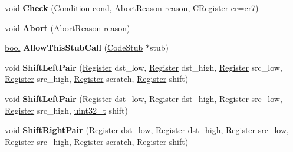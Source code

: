 \begin{DoxyCompactItemize}
void {\bfseries Check} (Condition cond, Abort\+Reason reason, \mbox{\hyperlink{classv8_1_1internal_1_1CRegister}{C\+Register}} cr=cr7)
\item 
\mbox{\label{classv8_1_1internal_1_1TurboAssembler_a714d3b6a967aed8110ff6170772850ec}} 
void {\bfseries Abort} (Abort\+Reason reason)
\item 
\mbox{\label{classv8_1_1internal_1_1TurboAssembler_a20348b464d89447388016d14eb6cb7e3}} 
\mbox{\hyperlink{classbool}{bool}} {\bfseries Allow\+This\+Stub\+Call} (\mbox{\hyperlink{classv8_1_1internal_1_1CodeStub}{Code\+Stub}} $\ast$stub)
\item 
\mbox{\label{classv8_1_1internal_1_1TurboAssembler_a0364a4d6542750fcecbc2dfd75e93b7a}} 
void {\bfseries Shift\+Left\+Pair} (\mbox{\hyperlink{classv8_1_1internal_1_1Register}{Register}} dst\+\_\+low, \mbox{\hyperlink{classv8_1_1internal_1_1Register}{Register}} dst\+\_\+high, \mbox{\hyperlink{classv8_1_1internal_1_1Register}{Register}} src\+\_\+low, \mbox{\hyperlink{classv8_1_1internal_1_1Register}{Register}} src\+\_\+high, \mbox{\hyperlink{classv8_1_1internal_1_1Register}{Register}} scratch, \mbox{\hyperlink{classv8_1_1internal_1_1Register}{Register}} shift)
\item 
\mbox{\label{classv8_1_1internal_1_1TurboAssembler_acb36c65b1134f076db27f56dc48e1a84}} 
void {\bfseries Shift\+Left\+Pair} (\mbox{\hyperlink{classv8_1_1internal_1_1Register}{Register}} dst\+\_\+low, \mbox{\hyperlink{classv8_1_1internal_1_1Register}{Register}} dst\+\_\+high, \mbox{\hyperlink{classv8_1_1internal_1_1Register}{Register}} src\+\_\+low, \mbox{\hyperlink{classv8_1_1internal_1_1Register}{Register}} src\+\_\+high, \mbox{\hyperlink{classuint32__t}{uint32\+\_\+t}} shift)
\item 
\mbox{\label{classv8_1_1internal_1_1TurboAssembler_a2abd2f3fdefffba7bcabf0ec495c5e41}} 
void {\bfseries Shift\+Right\+Pair} (\mbox{\hyperlink{classv8_1_1internal_1_1Register}{Register}} dst\+\_\+low, \mbox{\hyperlink{classv8_1_1internal_1_1Register}{Register}} dst\+\_\+high, \mbox{\hyperlink{classv8_1_1internal_1_1Register}{Register}} src\+\_\+low, \mbox{\hyperlink{classv8_1_1internal_1_1Register}{Register}} src\+\_\+high, \mbox{\hyperlink{classv8_1_1internal_1_1Register}{Register}} scratch, \mbox{\hyperlink{classv8_1_1internal_1_1Register}{Register}} shift)

\end{DoxyCompactItemize}
